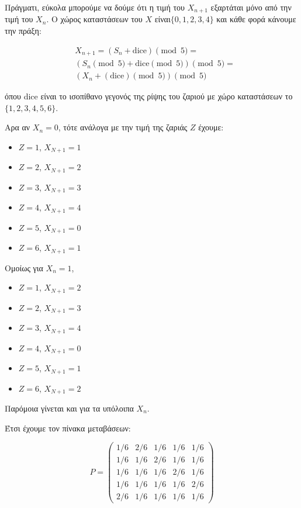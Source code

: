 \documentclass{article}
\newcommand{\english}[1]{\foreignlanguage{english}{{#1}}}
\begin{document}
Πράγματι, εύκολα μπορούμε να δούμε ότι η τιμή του $X_{n+1}$ εξαρτάται μόνο από την τιμή του $X_n$. Ο χώρος καταστάσεων του $X$ είναι$\{0, 1, 2, 3, 4\}$ και κάθε φορά κάνουμε την πράξη: 
\begin{otherlanguage}{english}
    \begin{align*}
        & X_{n+1}  = (S_{n} + \text{dice})\pmod 5 =\\
        & (S_{n}\pmod 5 + \text{dice} \pmod 5) \pmod 5 = \\
        & (X_n + (\text{dice}) \pmod 5) \pmod 5
    \end{align*}
\end{otherlanguage}


όπου \english{dice} είναι το ισοπίθανο γεγονός της ρίψης του ζαριού με χώρο καταστάσεων το $\{1, 2, 3, 4, 5, 6\}$.

Αρα αν $X_n = 0$, τότε ανάλογα με την τιμή της ζαριάς $Z$ έχουμε:
\begin{itemize}
    \item $Z=1$, $X_{N+1} = 1$
    \item $Z=2$, $X_{N+1} = 2$
    \item $Z=3$, $X_{N+1} = 3$
    \item $Z=4$, $X_{N+1} = 4$
    \item $Z=5$, $X_{N+1} = 0$
    \item $Z=6$, $X_{N+1} = 1$
\end{itemize}

Ομοίως για $X_n = 1$,
\begin{itemize}
    \item $Z=1$, $X_{N+1} = 2$
    \item $Z=2$, $X_{N+1} = 3$
    \item $Z=3$, $X_{N+1} = 4$
    \item $Z=4$, $X_{N+1} = 0$
    \item $Z=5$, $X_{N+1} = 1$
    \item $Z=6$, $X_{N+1} = 2$
\end{itemize}

Παρόμοια γίνεται και για τα υπόλοιπα $X_n$.

Έτσι έχουμε τον πίνακα μεταβάσεων:


\begin{equation*}
    P = 
    \begin{pmatrix}
        1/6 & 2/6 & 1/6 & 1/6 & 1/6\\
        1/6 & 1/6 & 2/6 & 1/6 & 1/6 \\
        1/6 & 1/6 & 1/6 & 2/6 & 1/6 \\
        1/6 & 1/6 & 1/6 & 1/6 & 2/6\\
        2/6 & 1/6 & 1/6 & 1/6 & 1/6
    \end{pmatrix}
\end{equation*}
\end{document}
